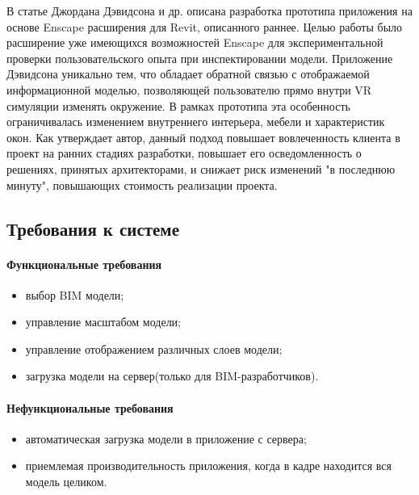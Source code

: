 В статье Джордана Дэвидсона и др. описана разработка прототипа приложения
на основе Enscape расширения для Revit, описанного раннее.
Целью работы было расширение уже имеющихся возможностей Enscape
для экспериментальной проверки пользовательского опыта при инспектировании модели.
Приложение Дэвидсона уникально тем, что обладает обратной связью
с отображаемой информационной моделью,
позволяющей пользователю прямо внутри VR симуляции изменять окружение.
В рамках прототипа эта особенность ограничивалась изменением
внутреннего интерьера, мебели и характеристик окон.
Как утверждает автор, данный подход повышает вовлеченность
клиента в проект на ранних стадиях разработки,
повышает его осведомленность о решениях, принятых архитекторами,
и снижает риск изменений "в последнюю минуту",
повышающих стоимость реализации проекта.
\cite{Davidson2019}

\lipsum[6][1-4] %
\cite{PourRahimian2019}


\subsection{Требования к системе}
\paragraph{Функциональные требования}
\begin{itemize}
    \item выбор BIM модели;
    \item управление масштабом модели;
    \item управление отображением различных слоев модели;
    \item загрузка модели на сервер(только для BIM-разработчиков).
\end{itemize}

\paragraph{Нефункциональные требования}
\begin{itemize}
    \item автоматическая загрузка модели в приложение с сервера;
    \item приемлемая производительность приложения, когда в кадре находится вся модель целиком.
\end{itemize}